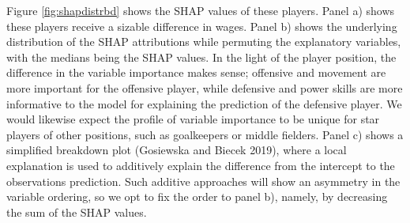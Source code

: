 \documentclass[
  article]{article}
\begin{document}
Figure \ref{fig:shapdistrbd} shows the SHAP values of these players. Panel a) shows these players receive a sizable difference in wages. Panel b) shows the underlying distribution of the SHAP attributions while permuting the explanatory variables, with the medians being the SHAP values. In the light of the player position, the difference in the variable importance makes sense; offensive and movement are more important for the offensive player, while defensive and power skills are more informative to the model for explaining the prediction of the defensive player. We would likewise expect the profile of variable importance to be unique for star players of other positions, such as goalkeepers or middle fielders. Panel c) shows a simplified breakdown plot (Gosiewska and Biecek 2019), where a local explanation is used to additively explain the difference from the intercept to the observations prediction. Such additive approaches will show an asymmetry in the variable ordering, so we opt to fix the order to panel b), namely, by decreasing the sum of the SHAP values.
\end{document}
